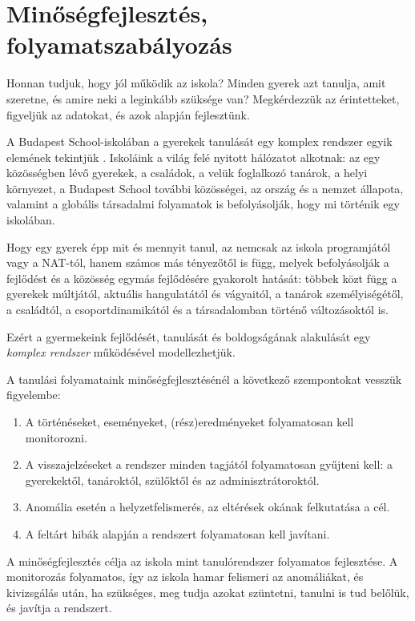 \hypertarget{minosegfejlesztes-folyamatszabalyozas}{%
\section{Minőségfejlesztés,
folyamatszabályozás}\label{minosegfejlesztes-folyamatszabalyozas}}

Honnan tudjuk, hogy jól működik az iskola? Minden gyerek azt tanulja,
amit szeretne, és amire neki a leginkább szüksége van? Megkérdezzük az
érintetteket, figyeljük az adatokat, és azok alapján fejlesztünk.

A Budapest School-iskolában a gyerekek tanulását egy komplex rendszer
egyik elemének tekintjük {\autocite{Barabasi2007}}. Iskoláink a
világ felé nyitott hálózatot alkotnak: az egy közösségben lévő gyerekek,
a családok, a velük foglalkozó tanárok, a helyi környezet, a Budapest
School további közösségei, az ország és a nemzet állapota, valamint a
globális társadalmi folyamatok is befolyásolják, hogy mi történik egy
iskolában.

Hogy egy gyerek épp mit és mennyit tanul, az nemcsak az iskola programjától
vagy a NAT-tól, hanem számos más tényezőtől is függ, melyek
befolyásolják a fejlődést és a közösség egymás fejlődésére gyakorolt
hatását: többek közt függ a gyerekek múltjától, aktuális hangulatától és
vágyaitól, a tanárok személyiségétől, a családtól, a csoportdinamikától
és a társadalomban történő változásoktól is.

Ezért a gyermekeink fejlődését, tanulását és boldogságának alakulását
egy \emph{komplex rendszer} működésével modellezhetjük.

A tanulási folyamataink minőségfejlesztésénél a következő szempontokat
vesszük figyelembe:

\begin{enumerate}
\def\labelenumi{\arabic{enumi}.}
\item
  A történéseket, eseményeket, (rész)eredményeket folyamatosan kell
  monitorozni.
\item
  A visszajelzéseket a rendszer minden tagjától folyamatosan gyűjteni
  kell: a gyerekektől, tanároktól, szülőktől és az adminisztrátoroktól.
\item
  Anomália esetén a helyzetfelismerés, az eltérések okának felkutatása a
  cél.
\item
  A feltárt hibák alapján a rendszert folyamatosan kell javítani.
\end{enumerate}

A minőségfejlesztés célja az iskola mint tanulórendszer folyamatos
fejlesztése. A monitorozás folyamatos, így az iskola hamar felismeri az
anomáliákat, és kivizsgálás után, ha szükséges, meg tudja azokat
szüntetni, tanulni is tud belőlük, és javítja a rendszert.

